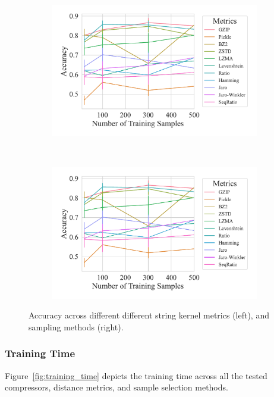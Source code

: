 \begin{figure}
	\begin{subfigure}
		\centering
		\includegraphics[width=.46\textwidth]{figs/kdd_nsl/metric_vs_accuracy.pdf}
	\end{subfigure}
	~
	\begin{subfigure}
		\centering
		\includegraphics[width=.46\textwidth]{figs/kdd_nsl/metric_vs_accuracy.pdf}
	\end{subfigure}
	\caption{Accuracy across different different string kernel metrics (left), and sampling methods (right).}
	\label{fig:accuracy_kdd}
\end{figure}

\subsubsection{Training Time}

Figure~\ref{fig:training_time} depicts the training time across all the tested compressors, distance metrics, and sample selection methods.

